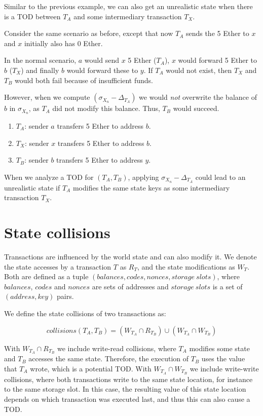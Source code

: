 \documentclass[draft,final]{vutinfth} %
\begin{document}
Similar to the previous example, we can also get an unrealistic state when there is a TOD between $T_A$ and some intermediary transaction $T_X$.

Consider the same scenario as before, except that now $T_A$ sends the 5 Ether to $x$ and $x$ initially also has 0 Ether.

In the normal scenario, $a$ would send $x$ 5 Ether ($T_A$), $x$ would forward 5 Ether to $b$ ($T_X$) and finally $b$ would forward these to $y$. If $T_A$ would not exist, then $T_X$ and $T_B$ would both fail because of insufficient funds.

However, when we compute $(\sigma_{X_n} - \Delta_{T_A})$ we would \emph{not} overwrite the balance of $b$ in $\sigma_{X_n}$, as $T_A$ did not modify this balance. Thus, $T_B$ would succeed.

\begin{enumerate}
    \item $T_A$: sender $a$ transfers 5 Ether to address $b$.
    \item $T_X$: sender $x$ transfers 5 Ether to address $b$.
    \item $T_B$: sender $b$ transfers 5 Ether to address $y$.
\end{enumerate}

When we analyze a TOD for $(T_A, T_B)$, applying $\sigma_{X_n} - \Delta_{T_A}$ could lead to an unrealistic state if $T_A$ modifies the same state keys as some intermediary transaction $T_X$.

\section{State collisions}

Transactions are influenced by the world state and can also modify it. We denote the state accesses by a transaction $T$ as $R_T$, and the state modifications as $W_T$. Both are defined as a tuple $(balances, codes, nonces, storage\ slots)$, where $balances$, $codes$ and $nonces$ are sets of addresses and $storage\ slots$ is a set of $(address, key)$ pairs.

We define the state collisions of two transactions as:

$$collisions(T_A, T_B) = (W_{T_A} \cap R_{T_B}) \cup (W_{T_A} \cap W_{T_B})$$

With $W_{T_A} \cap R_{T_B}$ we include write-read collisions, where $T_A$ modifies some state and $T_B$ accesses the same state. Therefore, the execution of $T_B$ uses the value that $T_A$ wrote, which is a potential TOD. With $W_{T_A} \cap W_{T_B}$ we include write-write collisions, where both transactions write to the same state location, for instance to the same storage slot. In this case, the resulting value of this state location depends on which transaction was executed last, and thus this can also cause a TOD.
\end{document}
